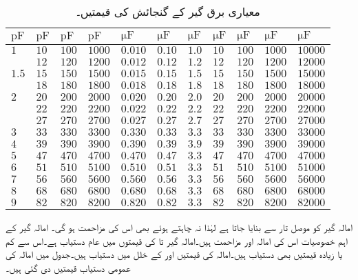 \begin{table}\caption{معیاری برق گیر کے گنجائش کی قیمتیں۔}
\centering
\begin{tabular}{lllllllllll}
$\si{\pico\farad}$ & $\si{\pico\farad}$ & $\si{\pico\farad}$ & $\si{\pico\farad}$ & $\si{\micro\farad}$ & $\si{\micro\farad}$ &  $\si{\micro\farad}$ &  $\si{\micro\farad}$ &  $\si{\micro\farad}$ &  $\si{\micro\farad}$ &  $\si{\micro\farad}$ \\
\hline
$1$ & $10$ &$100$ & $1000$ &$0.010$ & $0.10$ &$1.0$ & $10$ &$100$ & $1000$ & $\num{10000}$\\
 & $12$ &$120$ & $1200$ &$0.012$ & $0.12$ &$1.2$ & $12$ &$120$ & $1200$ & $\num{12000}$\\
 $1.5$& $15$ &$150$ & $1500$ &$0.015$ & $0.15$ &$1.5$ & $15$ &$150$ & $1500$ & $\num{15000}$\\
 & $18$ &$180$ & $1800$ &$0.018$ & $0.18$ &$1.8$ & $18$ &$180$ & $1800$ & $\num{18000}$\\
$2$ & $20$ &$200$ & $2000$ &$0.020$ & $0.20$ &$2.0$ & $20$ &$200$ & $2000$ & $\num{20000}$\\
 & $22$ &$220$ & $2200$ &$0.022$ & $0.22$ &$2.2$ & $22$ &$220$ & $2200$ & $\num{22000}$\\
 & $27$ &$270$ & $2700$ &$0.027$ & $0.27$ &$2.7$ & $27$ &$270$ & $2700$ & $\num{27000}$\\
$3$ & $33$ &$330$ & $3300$ &$0.330$ & $0.33$ &$3.3$ & $33$ &$330$ & $3300$ & $\num{33000}$\\
$4$ & $39$ &$390$ & $3900$ &$0.390$ & $0.39$ &$3.9$ & $39$ &$390$ & $3900$ & $\num{39000}$\\
$5$ & $47$ &$470$ & $4700$ &$0.470$ & $0.47$ &$3.3$ & $47$ &$470$ & $4700$ & $\num{47000}$\\
$6$ & $51$ &$510$ & $5100$ &$0.510$ & $0.51$ &$3.3$ & $51$ &$510$ & $5100$ & $\num{51000}$\\
$7$ & $56$ &$560$ & $5600$ &$0.560$ & $0.56$ &$3.3$ & $56$ &$560$ & $5600$ & $\num{56000}$\\
$8$ & $68$ &$680$ & $6800$ &$0.680$ & $0.68$ &$3.3$ & $68$ &$680$ & $6800$ & $\num{68000}$\\
$9$ & $82$ &$820$ & $8200$ &$0.820$ & $0.82$ &$3.3$ & $82$ &$820$ & $8200$ & $\num{82000}$
\end{tabular}
\label{جدول_امالہ_معیاری_برقی_گنجائش}
\end{table}

امالہ گیر کو موصل تار سے بنایا جاتا ہے لہٰذا نہ چاہتے ہوئے بھی اس کی مزاحمت ہو گی۔ امالہ گیر کے اہم خصوصیات اس کی امالہ اور مزاحمت ہیں۔امالہ گیر  تا  کی قیمتوں میں عام دستیاب ہے۔اس سے کم یا زیادہ قیمتیں بھی دستیاب ہیں۔امالہ کی قیمتیں  اور  کے خلل میں دستیاب ہیں۔جدول  میں امالہ کی عمومی دستیاب قیمتیں دی گئی ہیں۔


